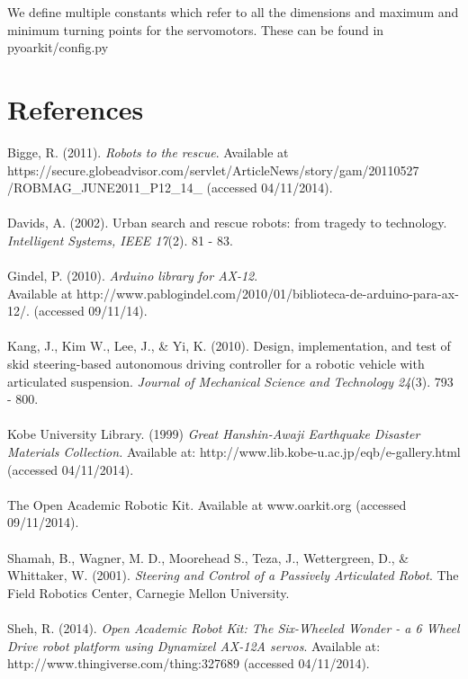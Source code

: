 \documentclass[]{article}
\begin{document}
We define multiple constants which refer to all the dimensions and maximum and minimum turning points for the servomotors. These can be found in pyoarkit/config.py

\section{References}
Bigge, R. (2011). \textit{Robots to the rescue}. Available at\\
https://secure.globeadvisor.com/servlet/ArticleNews/story/gam/20110527\\
/ROBMAG\_JUNE2011\_P12\_14\_ (accessed 04/11/2014).\\
\\
Davids, A. (2002). Urban search and rescue robots: from tragedy to technology. \textit{Intelligent Systems, IEEE 17}(2). 81 - 83.\\
\\
Gindel, P. (2010). \textit{Arduino library for AX-12}. \\Available at http://www.pablogindel.com/2010/01/biblioteca-de-arduino-para-ax-12/. (accessed 09/11/14).\\
\\
Kang, J., Kim W., Lee, J., \& Yi, K. (2010). Design, implementation, and test of skid steering-based autonomous driving controller for a robotic vehicle with articulated suspension. \textit{Journal of Mechanical Science and Technology 24}(3). 793 - 800.\\
\\
Kobe University Library. (1999) \textit{Great Hanshin-Awaji Earthquake Disaster Materials Collection.} Available at: http://www.lib.kobe-u.ac.jp/eqb/e-gallery.html (accessed 04/11/2014).\\
\\
The Open Academic Robotic Kit. Available at www.oarkit.org (accessed 09/11/2014).\\
\\
Shamah, B.,  Wagner, M. D., Moorehead S., Teza, J., Wettergreen, D., \& Whittaker, W. (2001). \textit{Steering and Control of a Passively Articulated Robot}. The Field Robotics Center, Carnegie Mellon University.\\
\\
Sheh, R. (2014). \textit{Open Academic Robot Kit: The Six-Wheeled Wonder - a 6 Wheel Drive robot platform using Dynamixel AX-12A servos}. Available at: http://www.thingiverse.com/thing:327689 (accessed 04/11/2014).
\end{document}
